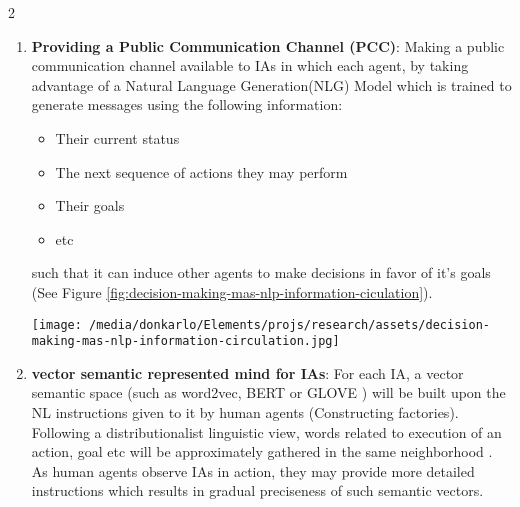 \documentclass{article}
\begin{document}
\begin{multicols}{2}
\begin{enumerate}
			\item \textbf{Providing a Public Communication Channel (PCC)}: Making a public communication channel available to IAs in which each agent, by taking advantage of a Natural Language Generation(NLG) Model  which is trained to  generate messages using the following information:
				\begin{itemize}
					\item Their current status
					\item The next sequence of actions they may perform
					\item Their goals
					\item etc
				\end{itemize}  
			such that it can induce other agents to make decisions in favor of it's goals (See Figure \ref{fig:decision-making-mas-nlp-information-ciculation}). 
			\begin{figure*}
				\centering
				\texttt{[image: /media/donkarlo/Elements/projs/research/assets/decision-making-mas-nlp-information-circulation.jpg]}
				\caption{Information circulation}
				\label{fig:decision-making-mas-nlp-information-ciculation}
			\end{figure*}	 
			
			\item \textbf{vector semantic represented mind for IAs}: For each IA, a vector semantic space (such as word2vec\citep{mikolov-2013-distributed-representations-of-words-and-phrases-and-their-compositionality}, BERT \citep{devlin-2019-bert-pre-training-of-deep-bidirectional-transformers-for-language-understanding} or GLOVE \citep{pennington-2014-glove-global-vectors-for-word-representation}) will be built upon the NL instructions given to it by human agents (Constructing factories). Following a distributionalist linguistic view, words related to execution of an action, goal etc will be approximately gathered in the same neighborhood \citep{firth-1957-studies-in-linguistic-analysis}. As human agents observe IAs in action, they may provide more detailed instructions which results in gradual preciseness of such semantic vectors.
			

\end{enumerate}
\end{multicols}
\end{document}
